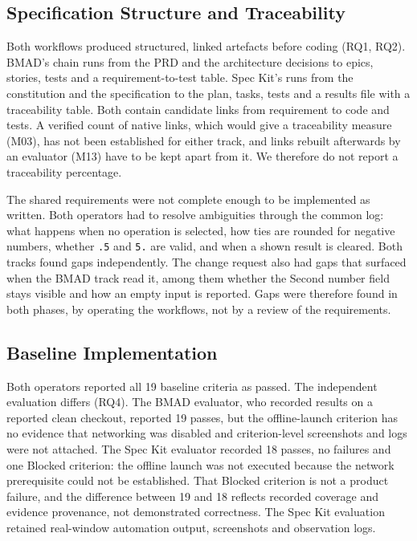 \documentclass[conference]{IEEEtran}
\begin{document}
\subsection{Specification Structure and
Traceability}\label{specification-structure-and-traceability}

Both workflows produced structured, linked artefacts before coding (RQ1,
RQ2). BMAD's chain runs from the PRD and the architecture decisions to
epics, stories, tests and a requirement-to-test table. Spec Kit's runs
from the constitution and the specification to the plan, tasks, tests
and a results file with a traceability table. Both contain candidate
links from requirement to code and tests. A verified count of native
links, which would give a traceability measure (M03), has not been
established for either track, and links rebuilt afterwards by an
evaluator (M13) have to be kept apart from it. We therefore do not
report a traceability percentage.

The shared requirements were not complete enough to be implemented as
written. Both operators had to resolve ambiguities through the common
log: what happens when no operation is selected, how ties are rounded
for negative numbers, whether \texttt{.5} and \texttt{5.} are valid, and
when a shown result is cleared. Both tracks found gaps independently.
The change request also had gaps that surfaced when the BMAD track read
it, among them whether the Second number field stays visible and how an
empty input is reported. Gaps were therefore found in both phases, by
operating the workflows, not by a review of the requirements.

\subsection{Baseline Implementation}\label{baseline-implementation}

Both operators reported all 19 baseline criteria as passed. The
independent evaluation differs (RQ4). The BMAD evaluator, who recorded
results on a reported clean checkout, reported 19 passes, but the
offline-launch criterion has no evidence that networking was disabled
and criterion-level screenshots and logs were not attached. The Spec Kit
evaluator recorded 18 passes, no failures and one Blocked criterion: the
offline launch was not executed because the network prerequisite could
not be established. That Blocked criterion is not a product failure, and
the difference between 19 and 18 reflects recorded coverage and evidence
provenance, not demonstrated correctness. The Spec Kit evaluation
retained real-window automation output, screenshots and observation
logs.
\end{document}
